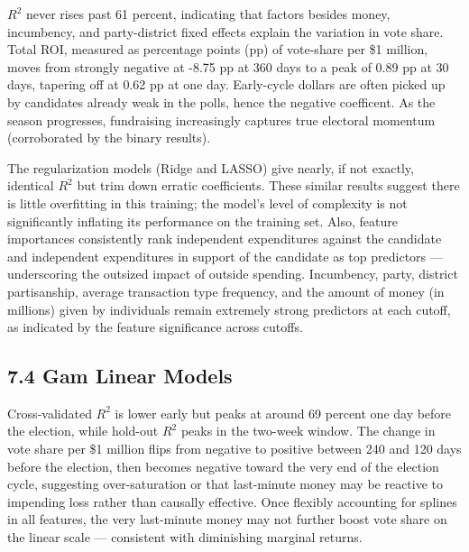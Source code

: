 $R^2$ never rises past 61 percent, indicating that factors besides money, incumbency, and party-district fixed effects explain the variation in vote share. Total ROI, measured as percentage points (pp) of vote-share per \$1 million, moves from strongly negative at -8.75 pp at 360 days to a peak of 0.89 pp at 30 days, tapering off at 0.62 pp at one day. Early-cycle dollars are often picked up by candidates already weak in the polls, hence the negative coefficent. As the season progresses, fundraising increasingly captures true electoral momentum (corroborated by the binary results).

The regularization models (Ridge and LASSO) give nearly, if not exactly, identical $R^2$ but trim down erratic coefficients. These similar results suggest there is little overfitting in this training; the model's level of complexity is not significantly inflating its performance on the training set. Also, feature importances consistently rank independent expenditures against the candidate and independent expenditures in support of the candidate as top predictors --- underscoring the outsized impact of outside spending. Incumbency, party, district partisanship, average transaction type frequency, and the amount of money (in millions) given by individuals remain extremely strong predictors at each cutoff, as indicated by the feature significance across cutoffs.

\subsection*{7.4 Gam Linear Models}

Cross-validated $R^2$ is lower early but peaks at around 69 percent one day before the election, while hold-out $R^2$ peaks in the two-week window. The change in vote share per \$1 million flips from negative to positive between 240 and 120 days before the election, then becomes negative toward the very end of the election cycle, suggesting over-saturation or that last-minute money may be reactive to impending loss rather than causally effective. Once flexibly accounting for splines in all features, the very last-minute money may not further boost vote share on the linear scale --- consistent with diminishing marginal returns. 

